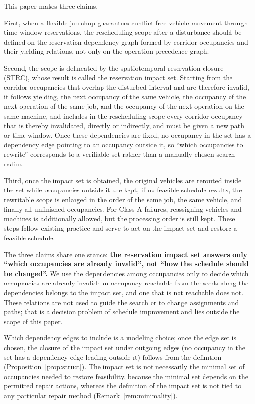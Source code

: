 \documentclass[manuscript,screen,review]{acmart}
\providecommand{\STRC}{\textsc{STRC}}
\begin{document}
This paper makes three claims.

First, when a flexible job shop guarantees conflict-free vehicle movement through time-window reservations, the rescheduling scope after a disturbance should be defined on the reservation dependency graph formed by corridor occupancies and their yielding relations, not only on the operation-precedence graph.

Second, the scope is delineated by the spatiotemporal reservation closure (\STRC), whose result is called the reservation impact set.
Starting from the corridor occupancies that overlap the disturbed interval and are therefore invalid, it follows yielding, the next occupancy of the same vehicle, the occupancy of the next operation of the same job, and the occupancy of the next operation on the same machine,
and includes in the rescheduling scope every corridor occupancy that is thereby invalidated, directly or indirectly, and must be given a new path or time window.
Once these dependencies are fixed, no occupancy in the set has a dependency edge pointing to an occupancy outside it,
so ``which occupancies to rewrite'' corresponds to a verifiable set rather than a manually chosen search radius.

Third, once the impact set is obtained, the original vehicles are rerouted inside the set while occupancies outside it are kept; if no feasible schedule results,
the rewritable scope is enlarged in the order of the same job, the same vehicle, and finally all unfinished occupancies.
For Class A failures, reassigning vehicles and machines is additionally allowed, but the processing order is still kept.
These steps follow existing practice and serve to act on the impact set and restore a feasible schedule.

The three claims share one stance: \textbf{the reservation impact set answers only ``which occupancies are already invalid'', not ``how the schedule should be changed''.}
We use the dependencies among occupancies only to decide which occupancies are already invalid: an occupancy reachable from the seeds along the dependencies belongs to the impact set, and one that is not reachable does not.
These relations are not used to guide the search or to change assignments and paths; that is a decision problem of schedule improvement and lies outside the scope of this paper.

Which dependency edges to include is a modeling choice; once the edge set is chosen, the closure of the impact set under outgoing edges (no occupancy in the set has a dependency edge leading outside it)
follows from the definition (Proposition~\ref{prop:struct}).
The impact set is not necessarily the minimal set of occupancies needed to restore feasibility, because the minimal set depends on the permitted repair actions,
whereas the definition of the impact set is not tied to any particular repair method (Remark~\ref{rem:minimality}).
\end{document}
